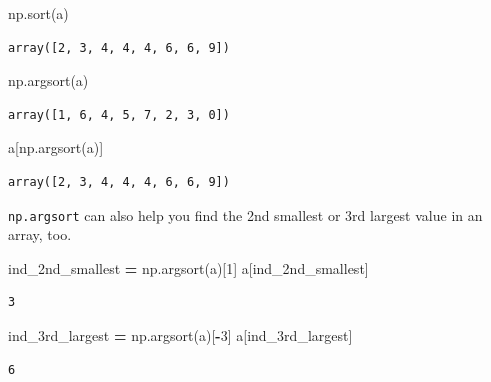\documentclass[
  letterpaper,
]{scrbook}
\newenvironment{Shaded}{\begin{snugshade}}{\end{snugshade}}
\newcommand{\DecValTok}[1]{\textcolor[rgb]{0.00,0.00,0.81}{#1}}
\newcommand{\NormalTok}[1]{#1}
\newcommand{\OperatorTok}[1]{\textcolor[rgb]{0.81,0.36,0.00}{\textbf{#1}}}
\begin{document}
\begin{Shaded}
\begin{Highlighting}[]
\NormalTok{np.sort(a)}
\end{Highlighting}
\end{Shaded}

\begin{verbatim}
array([2, 3, 4, 4, 4, 6, 6, 9])
\end{verbatim}

\begin{Shaded}
\begin{Highlighting}[]
\NormalTok{np.argsort(a)}
\end{Highlighting}
\end{Shaded}

\begin{verbatim}
array([1, 6, 4, 5, 7, 2, 3, 0])
\end{verbatim}

\begin{Shaded}
\begin{Highlighting}[]
\NormalTok{a[np.argsort(a)]}
\end{Highlighting}
\end{Shaded}

\begin{verbatim}
array([2, 3, 4, 4, 4, 6, 6, 9])
\end{verbatim}

\texttt{np.argsort} can also help you find the 2nd smallest or 3rd largest value in an array, too.

\begin{Shaded}
\begin{Highlighting}[]
\NormalTok{ind_2nd_smallest }\OperatorTok{=}\NormalTok{ np.argsort(a)[}\DecValTok{1}\NormalTok{]}
\NormalTok{a[ind_2nd_smallest]}
\end{Highlighting}
\end{Shaded}

\begin{verbatim}
3
\end{verbatim}

\begin{Shaded}
\begin{Highlighting}[]
\NormalTok{ind_3rd_largest }\OperatorTok{=}\NormalTok{ np.argsort(a)[}\OperatorTok{-}\DecValTok{3}\NormalTok{]}
\NormalTok{a[ind_3rd_largest]}
\end{Highlighting}
\end{Shaded}

\begin{verbatim}
6
\end{verbatim}
\end{document}
